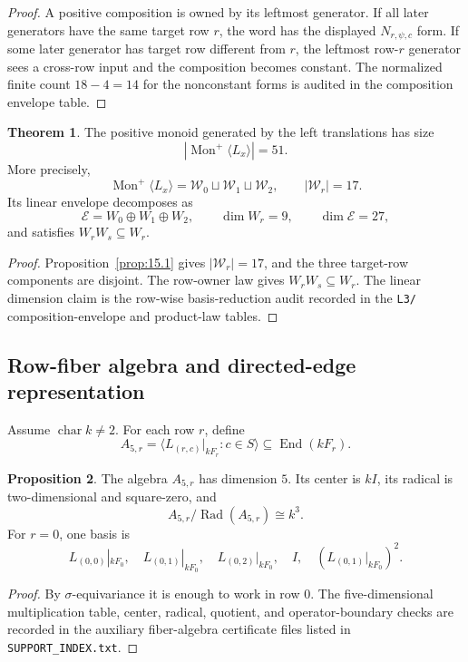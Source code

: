 \documentclass[11pt]{article}
\theoremstyle{definition}
\newtheorem{theorem}{Theorem}[section]
\newtheorem{proposition}[theorem]{Proposition}
\begin{document}
\begin{proof}
A positive composition is owned by its leftmost generator.  If all later
generators have the same target row \(r\), the word has the displayed
\(N_{r,\psi,c}\) form.  If some later generator has target row different
from \(r\), the leftmost row-\(r\) generator sees a cross-row input and
the composition becomes constant.  The normalized finite count
\(18-4=14\) for the nonconstant forms is audited in the composition
envelope table.
\end{proof}

\begin{theorem}
\label{thm:15.2}
The positive monoid generated by the left translations has size
\[
|\operatorname{Mon}^+\langle L_x\rangle|=51.
\]
More precisely,
\[
\operatorname{Mon}^+\langle L_x\rangle
=
\mathcal W_0\sqcup\mathcal W_1\sqcup\mathcal W_2,
\qquad |\mathcal W_r|=17.
\]
Its linear envelope decomposes as
\[
\mathcal E=W_0\oplus W_1\oplus W_2,
\qquad
\dim W_r=9,
\qquad
\dim\mathcal E=27,
\]
and satisfies \(W_rW_s\subseteq W_r\).
\end{theorem}

\begin{proof}
Proposition~\ref{prop:15.1} gives \(|\mathcal W_r|=17\), and the three
target-row components are disjoint.  The row-owner law gives
\(W_rW_s\subseteq W_r\).  The linear dimension claim is the row-wise basis-reduction audit recorded
in the \texttt{L3/} composition-envelope and product-law tables.
\end{proof}

\subsection{Row-fiber algebra and directed-edge representation}\label{the-five-dimensional-row-fiber-algebra}

Assume \(\operatorname{char}k\ne2\).  For each row \(r\), define
\[
A_{5,r}=\langle L_{(r,c)}|_{kF_r}:c\in S\rangle
\subseteq\operatorname{End}(kF_r).
\]

\begin{proposition}
\label{prop:15.3}
The algebra \(A_{5,r}\) has dimension \(5\).  Its center is \(kI\), its
radical is two-dimensional and square-zero, and
\[
A_{5,r}/\operatorname{Rad}(A_{5,r})\cong k^3.
\]
For \(r=0\), one basis is
\[
L_{(0,0)}|_{kF_0},\quad L_{(0,1)}|_{kF_0},\quad L_{(0,2)}|_{kF_0},
\quad I,\quad (L_{(0,1)}|_{kF_0})^2.
\]
\end{proposition}

\begin{proof}
By \(\sigma\)-equivariance it is enough to work in row \(0\).  The five-dimensional multiplication table, center, radical, quotient, and
operator-boundary checks are recorded in the auxiliary fiber-algebra
certificate files listed in \texttt{SUPPORT\_INDEX.txt}.
\end{proof}
\end{document}
